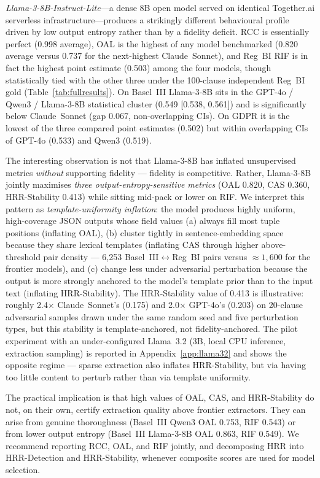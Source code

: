 \documentclass{article}
\begin{document}
\emph{Llama-3-8B-Instruct-Lite}---a dense 8B open model served on
identical Together.ai serverless infrastructure---produces a
strikingly different behavioural profile driven by low output
entropy rather than by a fidelity deficit. RCC is essentially
perfect (0.998 average), OAL is the highest of any model
benchmarked (0.820 average versus 0.737 for the next-highest
Claude~Sonnet), and Reg~BI RIF is in fact the highest point
estimate (0.503) among the four models, though statistically tied
with the other three under the 100-clause independent Reg~BI gold
(Table~\ref{tab:fullresults}). On Basel~III Llama-3-8B sits in the
GPT-4o / Qwen3 / Llama-3-8B statistical cluster (0.549 [0.538,
0.561]) and is significantly below Claude~Sonnet (gap 0.067,
non-overlapping CIs). On GDPR it is the lowest of the three
compared point estimates (0.502) but within overlapping CIs of
GPT-4o (0.533) and Qwen3 (0.519).

The interesting observation is not that Llama-3-8B has inflated
unsupervised metrics \emph{without} supporting fidelity --- fidelity
is competitive. Rather, Llama-3-8B jointly maximises \emph{three
output-entropy-sensitive metrics} (OAL 0.820, CAS 0.360,
HRR-Stability 0.413) while sitting mid-pack or lower on RIF. We
interpret this pattern as \emph{template-uniformity inflation}: the
model produces highly uniform, high-coverage JSON outputs whose
field values (a) always fill most tuple positions (inflating OAL),
(b) cluster tightly in sentence-embedding space because they share
lexical templates (inflating CAS through higher above-threshold
pair density --- 6{,}253 Basel~III$\leftrightarrow$Reg~BI pairs
versus $\approx 1{,}600$ for the frontier models), and (c) change
less under adversarial perturbation because the output is more
strongly anchored to the model's template prior than to the input
text (inflating HRR-Stability). The HRR-Stability value of 0.413 is
illustrative: roughly 2.4$\times$ Claude~Sonnet's (0.175) and
2.0$\times$ GPT-4o's (0.203) on 20-clause adversarial samples drawn
under the same random seed and five perturbation types, but this
stability is template-anchored, not fidelity-anchored.
The pilot experiment with an under-configured Llama~3.2 (3B, local
CPU inference, extraction sampling) is reported in
Appendix~\ref{app:llama32} and shows the opposite regime --- sparse
extraction also inflates HRR-Stability, but via having too little
content to perturb rather than via template uniformity.

The practical implication is that high values of OAL, CAS, and
HRR-Stability do not, on their own, certify extraction quality
above frontier extractors. They can arise from genuine thoroughness
(Basel~III Qwen3 OAL 0.753, RIF 0.543) or from lower output
entropy (Basel~III Llama-3-8B OAL 0.863, RIF 0.549). We recommend
reporting RCC, OAL, and RIF jointly, and decomposing HRR into
HRR-Detection and HRR-Stability, whenever composite scores are
used for model selection.
\end{document}
